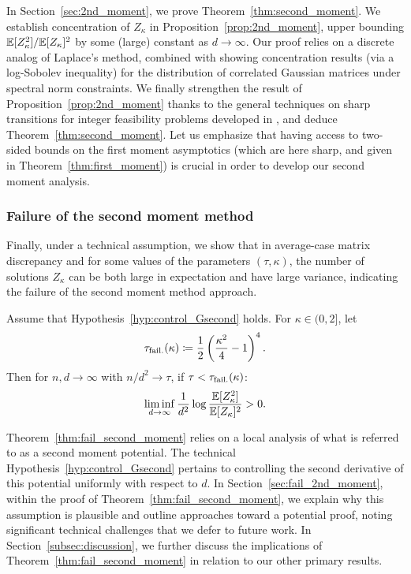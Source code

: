 \noindent
In Section~\ref{sec:2nd_moment}, we prove Theorem~\ref{thm:second_moment}. 
We establish concentration of $Z_\kappa$ in Proposition~\ref{prop:2nd_moment}, 
upper bounding $\mathbb{E}[Z_\kappa^2] / \mathbb{E}[Z_\kappa]^2$ by some (large) constant as $d \to \infty$. 
Our proof relies on a discrete analog of Laplace's method, combined with showing concentration results (via a log-Sobolev inequality) for the distribution of correlated Gaussian matrices under spectral norm constraints.
We finally strengthen the result of Proposition~\ref{prop:2nd_moment} thanks to the general techniques on sharp transitions for integer feasibility problems 
developed in \cite{altschuler2023zero}, and deduce Theorem~\ref{thm:second_moment}.
Let us emphasize that having access to two-sided bounds on the first moment asymptotics (which are here sharp, and given in Theorem~\ref{thm:first_moment}) 
is crucial in order to develop our second moment analysis.

\subsubsection{Failure of the second moment method}

\noindent
Finally, under a technical assumption, we show that in average-case matrix discrepancy and
for some values of the parameters $(\tau, \kappa)$,
the number of solutions $Z_\kappa$ can be both large in expectation and have large variance, indicating the failure of the 
second moment method approach.
\begin{theorem}
    \label{thm:fail_second_moment}
    Assume that Hypothesis~\ref{hyp:control_Gsecond} holds.
    For $\kappa \in (0,2]$, let 
    \begin{equation}\label{eq:tau_f}
        \tau_{{\rm fail.}}(\kappa) \coloneqq \frac{1}{2} \left(\frac{\kappa^2}{4} - 1\right)^4.
    \end{equation}
    Then for $n, d \to \infty$ with $n/d^2 \to \tau$, if $\tau < \tau_{\rm fail.}(\kappa)$:
    \begin{equation}\label{eq:fail_second_moment}
        \liminf_{d \to \infty} \frac{1}{d^2} \log \frac{\mathbb{E}[Z_\kappa^2]}{\mathbb{E}[Z_\kappa]^2} > 0.
    \end{equation}
\end{theorem}
\noindent
Theorem~\ref{thm:fail_second_moment} relies on a local analysis of what is referred to as a second moment potential.
The technical Hypothesis~\ref{hyp:control_Gsecond} pertains to controlling the second derivative of this potential uniformly with respect to $d$.
In Section~\ref{sec:fail_2nd_moment}, within the proof of Theorem~\ref{thm:fail_second_moment},
we explain why this assumption is plausible and outline approaches toward a potential proof, noting significant technical challenges that we defer to future work.
In Section~\ref{subsec:discussion}, we further discuss the implications of Theorem~\ref{thm:fail_second_moment} in relation to our other primary results.



